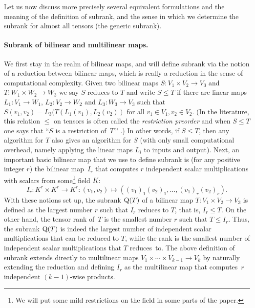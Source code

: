 \documentclass[11pt]{article}
\theoremstyle{definition}
\theoremstyle{remark}
\newcommand{\subrank}{{\rm Q}}
\begin{document}
Let us now discuss more precisely several equivalent formulations and the meaning of the definition of subrank, and the sense in which we determine the subrank for almost all tensors (the generic subrank).

\paragraph{Subrank of bilinear and multilinear maps.}
We first stay in the realm of bilinear maps, and will define subrank via the notion of a reduction between bilinear maps, which is really a reduction in the sense of computational complexity. Given two bilinear maps $S : V_1 \times V_2 \to V_3$ and $T : W_1 \times W_2 \to W_3$ we say $S$ reduces to $T$ and write $S\leq T$ if there are linear maps $L_1 : V_1 \to W_1$, $L_2 : V_2 \to W_2$ and $L_3 : W_3 \to V_3$ such that $S(v_1, v_2) = L_3(T(L_1(v_1), L_2(v_2))$ for all $v_1 \in V_1, v_2 \in V_2$. (In the literature, this relation $\leq$ on tensors is often called the \emph{restriction preorder} and when $S \leq T$ one says that ``$S$ is a restriction of~$T$\,'' \cite{strassen1987relative,burgisser1997algebraic}.) In other words, if $S \leq T$, then any algorithm for $T$ also gives an algorithm for $S$ (with only small computational overhead, namely applying the linear maps $L_i$ to inputs and output). Next, an important basic bilinear map that we use to define subrank is (for any positive integer $r$) the bilinear map~$I_r$ that computes $r$ independent scalar multiplications with scalars from some\footnote{We will put some mild restrictions on the field in some parts of the paper.} field $K$: 
\[
I_r : K^r \times K^r \to K^r : (v_1, v_2) \mapsto ( (v_1)_1 (v_2)_1, \ldots, (v_1)_r (v_2)_r ).
\]
With these notions set up, the subrank $\subrank(T)$ of a bilinear map $T : V_1 \times V_2 \to V_3$ is defined as the largest number $r$ such that $I_r$ reduces to $T$, that is, $I_r \leq T$.
On the other hand, the tensor rank of~$T$ is the smallest number $r$ such that $T \leq I_r$. Thus, the subrank $\subrank(T)$ is indeed the largest number of independent scalar multiplications that can be reduced to $T$, while the rank is the smallest number of independent scalar multiplications that $T$ reduces~to.
%
The above definition of subrank extends directly to multilinear maps $V_1 \times \cdots \times V_{k-1} \to V_k$ by naturally extending the reduction and defining 
$I_r$ as the multilinear map that computes~$r$ independent $(k-1)$-wise products.
%
%
%
%
%
%
%
%
%
\end{document}

